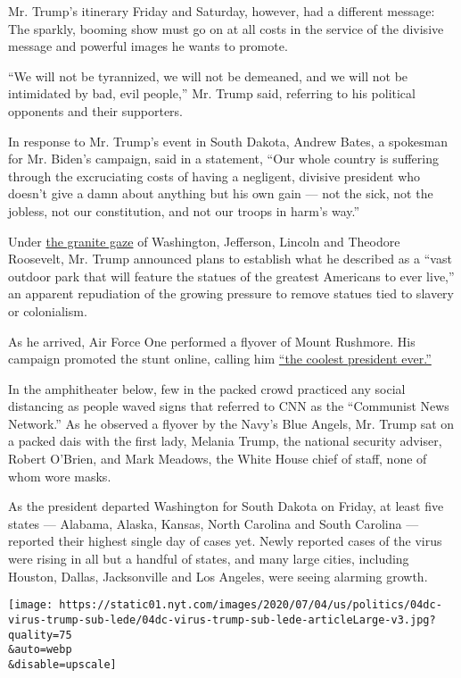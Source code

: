 Mr. Trump's itinerary Friday and Saturday, however, had a different
message: The sparkly, booming show must go on at all costs in the
service of the divisive message and powerful images he wants to promote.

``We will not be tyrannized, we will not be demeaned, and we will not be
intimidated by bad, evil people,'' Mr. Trump said, referring to his
political opponents and their supporters.

In response to Mr. Trump's event in South Dakota, Andrew Bates, a
spokesman for Mr. Biden's campaign, said in a statement, ``Our whole
country is suffering through the excruciating costs of having a
negligent, divisive president who doesn't give a damn about anything but
his own gain --- not the sick, not the jobless, not our constitution,
and not our troops in harm's way.''

Under
\href{https://www.nytimes.com/2020/07/01/us/mount-rushmore.html}{the
granite gaze} of Washington, Jefferson, Lincoln and Theodore Roosevelt,
Mr. Trump announced plans to establish what he described as a ``vast
outdoor park that will feature the statues of the greatest Americans to
ever live,'' an apparent repudiation of the growing pressure to remove
statues tied to slavery or colonialism.

As he arrived, Air Force One performed a flyover of Mount Rushmore. His
campaign promoted the stunt online, calling him
\href{https://twitter.com/TeamTrump/status/1279219853790978053}{``the
coolest president ever.''}

In the amphitheater below, few in the packed crowd practiced any social
distancing as people waved signs that referred to CNN as the ``Communist
News Network.'' As he observed a flyover by the Navy's Blue Angels, Mr.
Trump sat on a packed dais with the first lady, Melania Trump, the
national security adviser, Robert O'Brien, and Mark Meadows, the White
House chief of staff, none of whom wore masks.

As the president departed Washington for South Dakota on Friday, at
least five states --- Alabama, Alaska, Kansas, North Carolina and South
Carolina --- reported their highest single day of cases yet. Newly
reported cases of the virus were rising in all but a handful of states,
and many large cities, including Houston, Dallas, Jacksonville and Los
Angeles, were seeing alarming growth.

\texttt{[image: https://static01.nyt.com/images/2020/07/04/us/politics/04dc-virus-trump-sub-lede/04dc-virus-trump-sub-lede-articleLarge-v3.jpg?quality=75\\\&auto=webp\\\&disable=upscale]}

